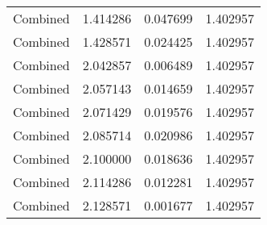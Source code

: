 \begin{tabular}{lrrr}
   Combined &   1.414286 &  0.047699 &              1.402957 \\
   Combined &   1.428571 &  0.024425 &              1.402957 \\
   Combined &   2.042857 &  0.006489 &              1.402957 \\
   Combined &   2.057143 &  0.014659 &              1.402957 \\
   Combined &   2.071429 &  0.019576 &              1.402957 \\
   Combined &   2.085714 &  0.020986 &              1.402957 \\
   Combined &   2.100000 &  0.018636 &              1.402957 \\
   Combined &   2.114286 &  0.012281 &              1.402957 \\
   Combined &   2.128571 &  0.001677 &              1.402957 \\
\bottomrule
\end{tabular}
